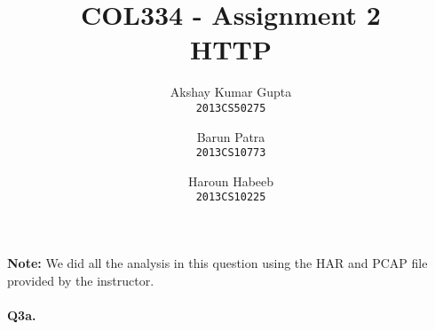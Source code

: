 \documentclass[12pt]{article}
\begin{document}
\title{COL334 - Assignment 2\\ HTTP}
\author{Akshay Kumar Gupta\\\texttt{2013CS50275} \and  Barun Patra\\\texttt{2013CS10773} \and Haroun Habeeb\\\texttt{2013CS10225}}
\date{}
\maketitle
\noindent
\textbf{Note:} We did all the analysis in this question using the HAR and PCAP file provided by the instructor. \\\\
{\bfseries Q3a.}  
\end{document}
